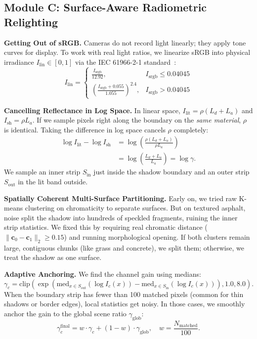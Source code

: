 \documentclass[10pt,twocolumn,letterpaper]{article}
\begin{document}
\subsection{Module C: Surface-Aware Radiometric Relighting}
\label{sec:relighting}

\textbf{Getting Out of sRGB.} Cameras do not record light linearly; they apply tone curves for display. To work with real light ratios, we linearize sRGB into physical irradiance $I_{\text{lin}} \in [0, 1]$ via the IEC 61966-2-1 standard~\cite{iec61966}:
\begin{equation}
I_{\text{lin}} = 
\begin{cases}
\frac{I_{\text{srgb}}}{12.92}, & I_{\text{srgb}} \le 0.04045 \\
\left(\frac{I_{\text{srgb}} + 0.055}{1.055}\right)^{2.4}, & I_{\text{srgb}} > 0.04045
\end{cases}
\end{equation}

\textbf{Cancelling Reflectance in Log Space.} In linear space, $I_{\text{lit}} = \rho (L_d + L_a)$ and $I_{\text{sh}} = \rho L_a$. If we sample pixels right along the boundary on the \textit{same material}, $\rho$ is identical. Taking the difference in log space cancels $\rho$ completely:
\begin{align}
\log I_{\text{lit}} - \log I_{\text{sh}} &= \log\left(\frac{\rho (L_d + L_a)}{\rho L_a}\right) \nonumber \\
&= \log\left(\frac{L_d + L_a}{L_a}\right) = \log \gamma.
\end{align}
We sample an inner strip $S_{\text{in}}$ just inside the shadow boundary and an outer strip $S_{\text{out}}$ in the lit band outside.

\textbf{Spatially Coherent Multi-Surface Partitioning.} Early on, we tried raw K-means clustering on chromaticity to separate surfaces. But on textured asphalt, noise split the shadow into hundreds of speckled fragments, ruining the inner strip statistics. We fixed this by requiring real chromatic distance ($\|\mathbf{c}_0 - \mathbf{c}_1\|_2 \ge 0.15$) and running morphological opening. If both clusters remain large, contiguous chunks (like grass and concrete), we split them; otherwise, we treat the shadow as one surface.

\textbf{Adaptive Anchoring.} We find the channel gain using medians:
\begin{equation}
\gamma_c = \text{clip}\left(\exp\left(\text{med}_{x \in S_{\text{out}}}(\log I_c(x)) - \text{med}_{x \in S_{\text{in}}}(\log I_c(x))\right), 1.0, 8.0\right).
\end{equation}
When the boundary strip has fewer than 100 matched pixels (common for thin shadows or border edges), local statistics get noisy. In those cases, we smoothly anchor the gain to the global scene ratio $\gamma_{\text{glob}}$:
\begin{equation}
\gamma_c^{\text{final}} = w \cdot \gamma_c + (1 - w) \cdot \gamma_{\text{glob}}, \quad w = \frac{N_{\text{matched}}}{100}.
\end{equation}
\end{document}

